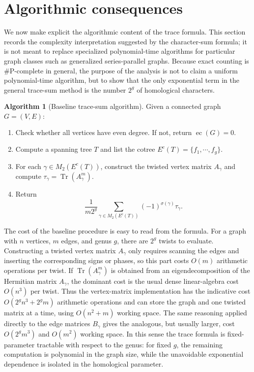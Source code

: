 \documentclass[11pt]{amsart}
\theoremstyle{plain}
\theoremstyle{definition}
\newtheorem{algorithm}[theorem]{Algorithm}
\DeclareMathOperator{\ec}{\operatorname{ec}}
\DeclareMathOperator{\trace}{\operatorname{Tr}}
\numberwithin{equation}{section}
\begin{document}
\section{Algorithmic consequences}\label{S:algorithmic}

We now make explicit the algorithmic content of the trace formula.  This section records the complexity interpretation suggested by the character-sum formula; it is not meant to replace specialized polynomial-time algorithms for particular graph classes such as generalized series-parallel graphs.  Because exact counting is \#P-complete in general, the purpose of the analysis is not to claim a uniform polynomial-time algorithm, but to show that the only exponential term in the general trace-sum method is the number $2^g$ of homological characters.

\begin{algorithm}[Baseline trace-sum algorithm]\label{A:baseline}
Given a connected graph $G=(V,E)$:
\begin{enumerate}[(1)]
\item Check whether all vertices have even degree.  If not, return $\ec(G)=0$.
\item Compute a spanning tree $T$ and list the cotree $E^c(T)=\{f_1,\cdots,f_g\}$.
\item For each $\gamma\in M_2(E^c(T))$, construct the twisted vertex matrix $A_\gamma$ and compute $\tau_\gamma=\trace(A_\gamma^m)$.
\item Return
$$
\frac{1}{m2^g}\sum_{\gamma\in M_2(E^c(T))}(-1)^{\sigma(\gamma)}\tau_\gamma.
$$
\end{enumerate}
\end{algorithm}

The cost of the baseline procedure is easy to read from the formula.  For a graph with $n$ vertices, $m$ edges, and genus $g$, there are $2^g$ twists to evaluate.  Constructing a twisted vertex matrix $A_\gamma$ only requires scanning the edges and inserting the corresponding signs or phases, so this part costs $O(m)$ arithmetic operations per twist.  If $\trace(A_\gamma^m)$ is obtained from an eigendecomposition of the Hermitian matrix $A_\gamma$, the dominant cost is the usual dense linear-algebra cost $O(n^3)$ per twist.  Thus the vertex-matrix implementation has the indicative cost $O(2^g n^3+2^g m)$ arithmetic operations and can store the graph and one twisted matrix at a time, using $O(n^2+m)$ working space.  The same reasoning applied directly to the edge matrices $B_\gamma$ gives the analogous, but usually larger, cost $O(2^g m^3)$ and $O(m^2)$ working space.  In this sense the trace formula is fixed-parameter tractable with respect to the genus: for fixed $g$, the remaining computation is polynomial in the graph size, while the unavoidable exponential dependence is isolated in the homological parameter.
\end{document}

